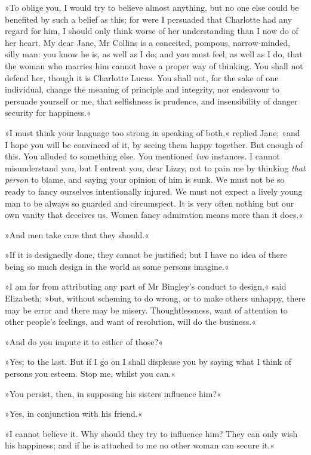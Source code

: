 »To oblige you, I would try to believe almost anything, but no one else could be benefited by such a belief as this; for were I persuaded that Charlotte had any regard for him, I should only think worse of her understanding than I now do of her heart. My dear Jane, Mr Collins is a conceited, pompous, narrow-minded, silly man: you know he is, as well as I do; and you must feel, as well as I do, that the woman who marries him cannot have a proper way of thinking. You shall not defend her, though it is Charlotte Lucas. You shall not, for the sake of one individual, change the meaning of principle and integrity, nor endeavour to persuade yourself or me, that selfishness is prudence, and insensibility of danger security for happiness.«

»I must think your language too strong in speaking of both,« replied Jane; »and I hope you will be convinced of it, by seeing them happy together. But enough of this. You alluded to something else. You mentioned \textit{two} instances. I cannot misunderstand you, but I entreat you, dear Lizzy, not to pain me by thinking \textit{that person} to blame, and saying your opinion of him is sunk. We must not be so ready to fancy ourselves intentionally injured. We must not expect a lively young man to be always so guarded and circumspect. It is very often nothing but our own vanity that deceives us. Women fancy admiration means more than it does.«

»And men take care that they should.«

»If it is designedly done, they cannot be justified; but I have no idea of there being so much design in the world as some persons imagine.«

»I am far from attributing any part of Mr Bingley's conduct to design,« said Elizabeth; »but, without scheming to do wrong, or to make others unhappy, there may be error and there may be misery. Thoughtlessness, want of attention to other people's feelings, and want of resolution, will do the business.«

»And do you impute it to either of those?«

»Yes; to the last. But if I go on I shall displease you by saying what I think of persons you esteem. Stop me, whilst you can.«

»You persist, then, in supposing his sisters influence him?«

»Yes, in conjunction with his friend.«

»I cannot believe it. Why should they try to influence him? They can only wish his happiness; and if he is attached to me no other woman can secure it.«

